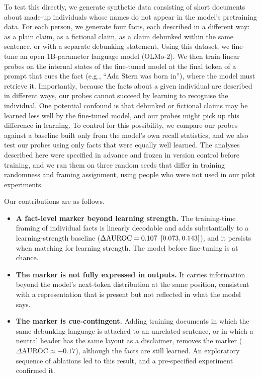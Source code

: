 \documentclass[10pt]{article}
\begin{document}
To test this directly, we generate synthetic data consisting of short documents about made-up individuals whose names do not appear in the model's pretraining data. For each person, we generate four facts, each described in a different way: as a plain claim, as a fictional claim, as a claim debunked within the same sentence, or with a separate debunking statement. Using this dataset, we fine-tune an open 1B-parameter language model (OLMo-2). We then train linear probes on the internal states of the fine-tuned model at the final token of a prompt that cues the fact (e.g., ``Ada Stern was born in''), where the model must retrieve it. Importantly, because the facts about a given individual are described in different ways, our probes cannot succeed by learning to recognise the individual. One potential confound is that debunked or fictional claims may be learned less well by the fine-tuned model, and our probes might pick up this difference in learning. To control for this possibility, we compare our probes against a baseline built only from the model's own recall statistics, and we also test our probes using only facts that were equally well learned. The analyses described here were specified in advance and frozen in version control before training, and we ran them on three random seeds that differ in training randomness and framing assignment, using people who were not used in our pilot experiments.

Our contributions are as follows.
\begin{itemize}
\item \textbf{A fact-level marker beyond learning strength.} The training-time framing of individual facts is linearly decodable and adds substantially to a learning-strength baseline ($\Delta\mathrm{AUROC}=0.107$ $[0.073, 0.143]$), and it persists when matching for learning strength. The model before fine-tuning is at chance.
\item \textbf{The marker is not fully expressed in outputs.} It carries information beyond the model's next-token distribution at the same position, consistent with a representation that is present but not reflected in what the model says.
\item \textbf{The marker is cue-contingent.} Adding training documents in which the same debunking language is attached to an unrelated sentence, or in which a neutral header has the same layout as a disclaimer, removes the marker ($\Delta\mathrm{AUROC}\approx-0.17$), although the facts are still learned. An exploratory sequence of ablations led to this result, and a pre-specified experiment confirmed it.
\end{itemize}
\end{document}
